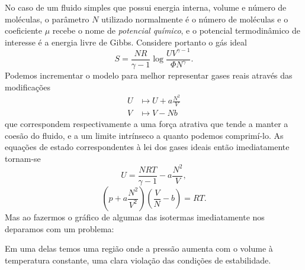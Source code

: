 No caso de um fluido simples que possui energia interna, volume e número de
moléculas, o parâmetro $N$ utilizado normalmente é o número de moléculas e o
coeficiente $\mu$ recebe o nome de \emph{potencial químico}, e o potencial
termodinâmico de interesse é a energia livre de Gibbs. Considere portanto o gás
ideal
$$S=\frac{NR}{\gamma-1}\log\frac{UV^{\gamma-1}}{\Phi N^\gamma}.$$
Podemos incrementar o modelo para melhor representar gases reais através das
modificações
\begin{align*}
    U&\mapsto U+a\frac{N^2}{V}\\
    V&\mapsto V-Nb
\end{align*}
que correspondem respectivamente a uma força atrativa que tende a manter a
coesão do fluido, e a um limite intrínseco a quanto podemos comprimí-lo. 
As equações de estado correspondentes à lei dos gases ideais então imediatamente
tornam-se
$$U=\frac{NRT}{\gamma-1}-a\frac{N^2}{V},$$
$$\left(p+a\frac{N^2}{V^2}\right)\left(\frac{V}{N}-b\right)=RT.$$
Mas ao fazermos o gráfico de algumas das isotermas imediatamente nos deparamos
com um problema:
\begin{figure}[H]
    \centering
\end{figure}
\noindent Em uma delas temos uma região onde a pressão aumenta com o volume à
temperatura constante, uma clara violação das condições de estabilidade.

